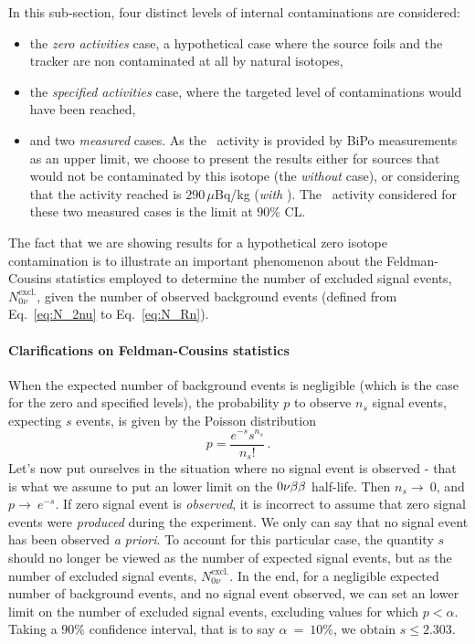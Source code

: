 In this sub-section, four distinct levels of internal contaminations are considered:
\begin{itemize}
\item the \emph{zero activities} case, a hypothetical case where the source foils and the tracker are non contaminated at all by natural isotopes,
\item the \emph{specified activities} case, where the targeted level of contaminations would have been reached,
\item and two \emph{measured} cases.
  As the \Bi\ activity is provided by BiPo measurements as an upper limit, we choose to present the results either for sources that would not be contaminated by this isotope (the \emph{without \Bi} case), or considering that the activity reached is $290\,\mu$Bq/kg (\emph{with \Bi}).
  The \Tl\ activity considered for these two measured cases is the limit at $90$\% CL.
\end{itemize}
The fact that we are showing results for a hypothetical zero isotope contamination is to illustrate an important phenomenon about the Feldman-Cousins statistics employed to determine the number of excluded signal events, $N_{0\nu}^{\text{excl.}}$, given the number of observed background events (defined from Eq.~\eqref{eq:N_2nu} to Eq.~\eqref{eq:N_Rn}).

\paragraph{Clarifications on Feldman-Cousins statistics}
When the expected number of background events is negligible (which is the case for the zero and specified levels), the probability $p$ to observe $n_{s}$ signal events, expecting $s$ events, is given by the Poisson distribution
\begin{equation}
p = \frac{e^{-s}s^{n_{s}}}{n_{s}!}\,.
\end{equation}
Let's now put ourselves in the situation where no signal event is observed - that is what we assume to put an lower limit on the $0\nu\beta\beta$ half-life.
Then $n_{s}\rightarrow~0$, and $p\rightarrow~e^{-s}$.
If zero signal event is \emph{observed}, it is incorrect to assume that zero signal events were \emph{produced} during the experiment.
We only can say that no signal event has been observed \emph{a priori}.
To account for this particular case, the quantity $s$ should no longer be viewed as the number of expected signal events, but as the number of excluded signal events, $N_{0\nu}^{\text{excl.}}$.
In the end, for a negligible expected number of background events, and no signal event observed, we can set an lower limit on the number of excluded signal events, excluding values for which $p < \alpha$.
Taking a $90\%$ confidence interval, that is to say $\alpha~=~10\%$, we obtain $s \leq 2.303$.

